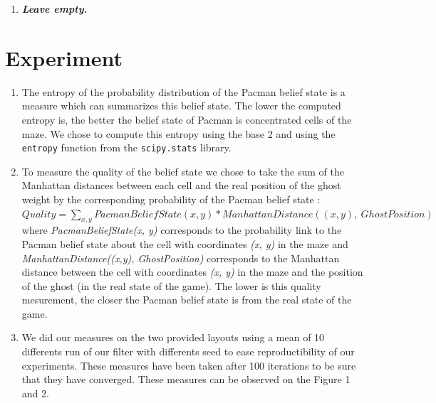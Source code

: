 \documentclass{article}
\begin{document}
\begin{enumerate}[label=\alph*.,leftmargin=*]
    \item \textbf{\textit{Leave empty.}}
\end{enumerate}

\section{Experiment}

\begin{enumerate}[label=\alph*.,leftmargin=*]
    \item The entropy of the probability distribution of the Pacman belief state is a measure which can summarizes this belief state. 
    The lower the computed entropy is, the better the belief state of Pacman is concentrated cells of the maze. We chose to compute this entropy using the base 2 and using the \texttt{entropy} function from the \texttt{scipy.stats} library.
    \item To measure the quality of the belief state we chose to take the sum of the Manhattan distances between each cell and the real position of the ghost weight by the corresponding probability of the Pacman belief state :\\
    
    $Quality = {\sum_{x, y} {PacmanBeliefState(x, y) * ManhattanDistance((x, y), \ GhostPosition)}}$\\

    where \textit{PacmanBeliefState(x, y)} corresponds to the probability link to the Pacman belief state about the cell with coordinates \textit{(x, y)} in the maze and \textit{ManhattanDistance((x,y), GhostPosition)} corresponds
    to the Manhattan distance between the cell with coordinates \textit{(x, y)} in the maze and the position of the ghost (in the real state of the game). The lower is this quality mesurement, the closer the Pacman belief state is from the real state of the game.
    \item We did our measures on the two provided layouts using a mean of 10 differents run of our filter with differents seed to ease reproductibility of our experiments. These measures have been taken after 100 iterations to be sure that they have converged.
    These measures can be observed on the Figure 1 and 2. 


\end{enumerate}
\end{document}
